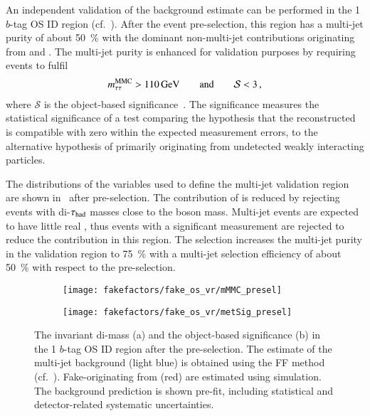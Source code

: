 An independent validation of the background estimate can be performed
in the 1 $b$-tag OS ID region (cf.\ ).
After the event pre-selection, this region has a multi-jet purity of
about \SI{50}{\percent} with the dominant non-multi-jet contributions
originating from \Zjets and \ttbar. The multi-jet purity is enhanced
for validation purposes by requiring events to fulfil
\begin{align*}
  m_{\tau\tau}^\text{MMC} > \SI{110}{\ensuremath{\text{GeV}}} \qquad \text{and} \qquad \mathcal{S} < 3 \,\text{,}
\end{align*}
where $\mathcal{S}$ is the object-based \pTmissAbs
significance~\cite{ATLAS-CONF-2018-038}. The \pTmissAbs significance
measures the statistical significance of a test comparing the
hypothesis that the reconstructed \pTmissAbs is compatible with zero
within the expected measurement errors, to the alternative hypothesis
of \pTmissAbs primarily originating from undetected weakly interacting
particles.

The distributions of the variables used to define the multi-jet
validation region are shown in~
after pre-selection. The contribution of \Zjets is reduced by
rejecting events with di-$\tau_{\text{had}}$ masses close to the \PZ boson mass.
Multi-jet events are expected to have little real \pTmissAbs, thus
events with a significant \pTmissAbs measurement are rejected to
reduce the \ttbar contribution in this region. The selection increases
the multi-jet purity in the validation region to \SI{75}{\percent}
with a multi-jet selection efficiency of about \SI{50}{\percent} with
respect to the pre-selection.

\begin{figure}[htbp]
  \centering

  \begin{subfigure}{0.45\textwidth}
    \texttt{[image: fakefactors/fake\_os\_vr/mMMC\_presel]}
    \subcaption{}
  \end{subfigure}\hspace*{0.04\textwidth}%
  \begin{subfigure}{0.45\textwidth}
    \texttt{[image: fakefactors/fake\_os\_vr/metSig\_presel]}
    \subcaption{}
  \end{subfigure}

  \caption{The invariant di-\tauhad mass (a) and the object-based \pTmissAbs
    significance (b) in the 1 $b$-tag OS ID region after the pre-selection. The
    estimate of the multi-jet background (light blue) is obtained using the FF
    method (cf.\ ). Fake-\tauhadvis originating
    from \ttbar (red) are estimated using simulation. The background prediction
    is shown pre-fit, including statistical and detector-related systematic
    uncertainties.}
  \label{fig:fake_factor_OSVR_cutvars}
\end{figure}

